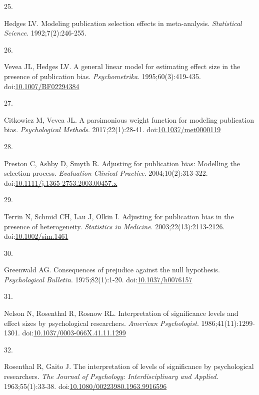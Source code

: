 \documentclass[
  man, donotrepeattitle,floatsintext]{apa7}
\newlength{\cslhangindent}
\newlength{\csllabelwidth}
\newenvironment{CSLReferences}[2] %
 {\begin{list}{}{%
  \setlength{\itemindent}{0pt}
  \setlength{\leftmargin}{0pt}
  \setlength{\parsep}{0pt}
  \ifodd #1
   \setlength{\leftmargin}{\cslhangindent}
   \setlength{\itemindent}{-1\cslhangindent}
  \fi
  \setlength{\itemsep}{#2\baselineskip}}}
 {\end{list}}
\newcommand{\CSLLeftMargin}[1]{\parbox[t]{\csllabelwidth}{\strut#1\strut}}
\newcommand{\CSLRightInline}[1]{\parbox[t]{\linewidth - \csllabelwidth}{\strut#1\strut}}
\begin{document}
\begin{CSLReferences}{0}{1}
\CSLLeftMargin{25. }%
\CSLRightInline{Hedges LV. Modeling publication selection effects in meta-analysis. \emph{Statistical Science}. 1992;7(2):246-255.}

\CSLLeftMargin{26. }%
\CSLRightInline{Vevea JL, Hedges LV. A general linear model for estimating effect size in the presence of publication bias. \emph{Psychometrika}. 1995;60(3):419-435. doi:\href{https://doi.org/10.1007/BF02294384}{10.1007/BF02294384}}

\CSLLeftMargin{27. }%
\CSLRightInline{Citkowicz M, Vevea JL. {A parsimonious weight function for modeling publication bias}. \emph{Psychological Methods}. 2017;22(1):28-41. doi:\href{https://doi.org/10.1037/met0000119}{10.1037/met0000119}}

\CSLLeftMargin{28. }%
\CSLRightInline{Preston C, Ashby D, Smyth R. Adjusting for publication bias: Modelling the selection process. \emph{Evaluation Clinical Practice}. 2004;10(2):313-322. doi:\href{https://doi.org/10.1111/j.1365-2753.2003.00457.x}{10.1111/j.1365-2753.2003.00457.x}}

\CSLLeftMargin{29. }%
\CSLRightInline{Terrin N, Schmid CH, Lau J, Olkin I. Adjusting for publication bias in the presence of heterogeneity. \emph{Statistics in Medicine}. 2003;22(13):2113-2126. doi:\href{https://doi.org/10.1002/sim.1461}{10.1002/sim.1461}}

\CSLLeftMargin{30. }%
\CSLRightInline{Greenwald AG. Consequences of prejudice against the null hypothesis. \emph{Psychological Bulletin}. 1975;82(1):1-20. doi:\href{https://doi.org/10.1037/h0076157}{10.1037/h0076157}}

\CSLLeftMargin{31. }%
\CSLRightInline{Nelson N, Rosenthal R, Rosnow RL. Interpretation of significance levels and effect sizes by psychological researchers. \emph{American Psychologist}. 1986;41(11):1299-1301. doi:\href{https://doi.org/10.1037/0003-066X.41.11.1299}{10.1037/0003-066X.41.11.1299}}

\CSLLeftMargin{32. }%
\CSLRightInline{Rosenthal R, Gaito J. The interpretation of levels of significance by psychological researchers. \emph{The Journal of Psychology: Interdisciplinary and Applied}. 1963;55(1):33-38. doi:\href{https://doi.org/10.1080/00223980.1963.9916596}{10.1080/00223980.1963.9916596}}


\end{CSLReferences}
\end{document}
